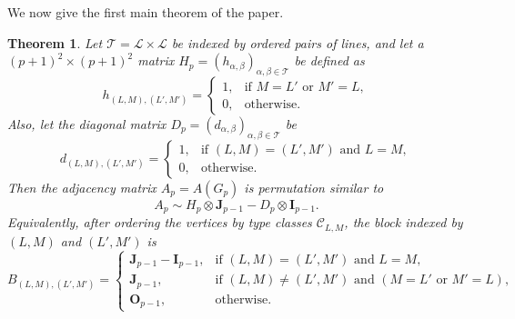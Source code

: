 \documentclass[12pt]{article}
\newtheorem{theorem}{Theorem}[section]
\theoremstyle{definition}
\newcommand{\calL}{\mathcal{L}}
\newcommand{\calT}{\mathcal{T}}
\newcommand{\calC}{\mathcal{C}}
\newcommand{\I}{\mathbf{I}}
\newcommand{\J}{\mathbf{J}}
\renewcommand{\O}{\mathbf{O}}
\begin{document}
	\medskip
	We now give the first main theorem of the paper.	
	\begin{theorem}\label{thm:block}
		Let $\calT=\calL\times \calL$ be indexed by ordered pairs of lines, and let a $(p+1)^2\times (p+1)^2$ matrix $H_p=(h_{\alpha,\beta})_{\alpha,\beta\in\calT}$ be defined as
		$$
		h_{(L,M),(L',M')}=
		\begin{cases}
			1,& \text{if } M=L' \text{ or } M'=L,\\
			0,& \text{otherwise.}
		\end{cases}
		$$
		Also, let the diagonal matrix $D_p=(d_{\alpha,\beta})_{\alpha,\beta\in\calT}$ be 
		$$
		d_{(L,M),(L',M')}=
		\begin{cases}
			1,& \text{if } (L,M)=(L',M') \text{ and } L=M,\\
			0,& \text{otherwise.}
		\end{cases}
		$$
		Then the adjacency matrix $A_p=A(G_p)$ is permutation similar to
		$$
		A_p \sim H_p\otimes \J_{p-1}-D_p\otimes \I_{p-1}.
		$$
		Equivalently, after ordering the vertices by type classes $\calC_{L,M}$, the block indexed by $(L,M)$ and $(L',M')$ is
		$$
		B_{(L,M),(L',M')}=
		\begin{cases}
			\J_{p-1}-\I_{p-1},& \text{if } (L,M)=(L',M') \text{ and } L=M,\\[1mm]
			\J_{p-1},& \text{if } (L,M)\neq (L',M') \text{ and } (M=L' \text{ or } M'=L),\\[1mm]
			\O_{p-1},& \text{otherwise.}
		\end{cases}
		$$
	\end{theorem}
\end{document}
